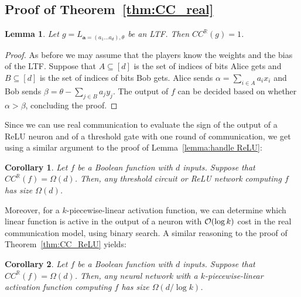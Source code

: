 \documentclass[11pt]{article}
\newtheorem{lemma}{Lemma}[section]
\newtheorem{corollary}{Corollary}[section]
\newcommand{\ba}{\mathbf{a}}
\newcommand{\co}{{\cal O}}
\begin{document}
\subsection{Proof of Theorem~\ref{thm:CC_real}}
\label{app:proof of theorem CC real}

\begin{lemma}
Let $g=L_{\ba=(a_1 \ldots a_d), \theta}$ be an LTF. Then $CC^{\mathbb{R}}(g)=1$.
\end{lemma}
\begin{proof}
As before we may assume that the players know the weights and the bias of the LTF.
Suppose that $A \subseteq [d]$ is the set of indices of bits Alice gets and $B \subseteq [d]$ is the set of indices of bits Bob gets. Alice sends $\alpha=\sum_{i \in A} a_ix_i$ and Bob sends $\beta=\theta-\sum_{j \in B} a_jy_j$.
The output of $f$ can be decided based on whether $\alpha > \beta$,
concluding the proof.
\end{proof}

Since we can use real communication to evaluate the sign of the output of a ReLU neuron and of a threshold gate with one round of communication, we get using a similar argument to the proof of Lemma~\ref{lemma:handle ReLU}: %
\begin{corollary}
Let $f$ be a Boolean function with $d$ inputs. 
Suppose that $CC^{\mathbb{R}}(f)= \Omega(d)$. Then, any threshold circuit or ReLU network computing $f$ has size $\Omega(d)$.
\end{corollary}

Moreover, for a $k$-piecewise-linear activation function, we can determine which linear function is active in the output of a neuron with $\co(\log k)$ cost in the real communication model, using binary search. A similar reasoning to the proof of  Theorem~\ref{thm:CC_ReLU} yields:
\begin{corollary}
Let $f$ be a Boolean function with $d$ inputs. 
Suppose that $CC^{\mathbb{R}}(f)= \Omega(d)$. Then, any neural network with a $k$-piecewise-linear activation function computing $f$ has size $\Omega(d/\log k)$.
\end{corollary}
\end{document}
